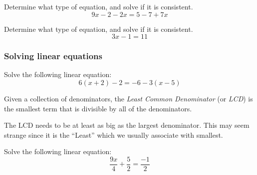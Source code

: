 \begin{exercise}
Determine what type of equation, and solve if it is consistent.
\[
9x-2-2x=5-7+7x
\]
\end{exercise}
\begin{solution}[2in]

\end{solution}
\vspace{0.5em}

\begin{exercise}
Determine what type of equation, and solve if it is consistent.
\[
3x-1=11
\]
\end{exercise}
\begin{solution}[2in]

\end{solution}
\vspace{0.5em}

\subsubsection{Solving linear equations}

\begin{exercise}
Solve the following linear equation:
\[
6(x+2)-2=-6-3(x-5)
\]
\end{exercise}
\begin{solution}[2in]

\end{solution}
\vspace{0.5em}

\begin{definition}\label{def: LCD}
Given a collection of denominators, the \emph{Least Common Denominator} (or \emph{LCD})
is the smallest term that is divisible by all of the denominators.
\end{definition}

\vspace{0.5em}

\begin{note}
The LCD needs to be at least as big as the largest denominator. This may seem
strange since it is the ``Least'' which we usually associate with smallest.
\end{note}

\newpage

\begin{exercise}
Solve the following linear equation:
\[
\frac{9x}{4}+\frac{5}{2}=\frac{-1}{2}
\]
\end{exercise}
\begin{solution}[2in]

\end{solution}
\vspace{0.5em}

